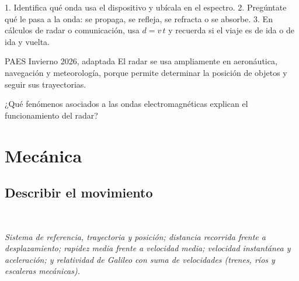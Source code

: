 \begin{clave} 1. Identifica qué onda usa el dispositivo y ubícala en el espectro. 2. Pregúntate qué le pasa a la onda: se propaga, se refleja, se refracta o se absorbe. 3. En cálculos de radar o comunicación, usa $d = v\,t$ y recuerda si el viaje es de ida o de ida y vuelta.\end{clave}
\begin{elejemplo}{PAES Invierno 2026, adaptada}
El radar se usa ampliamente en aeronáutica, navegación y meteorología, porque permite determinar la posición de objetos y seguir sus trayectorias.

¿Qué fenómenos asociados a las ondas electromagnéticas explican el funcionamiento del radar?
\end{elejemplo}

\chapter{Mecánica}
\section[Describir el movimiento]{Describir el movimiento}
\modcomun\ \ {\color{gris}\itshape Sistema de referencia, trayectoria y posición; distancia recorrida frente a desplazamiento; rapidez media frente a velocidad media; velocidad instantánea y aceleración; y relatividad de Galileo con suma de velocidades (trenes, ríos y escaleras mecánicas).\par}
